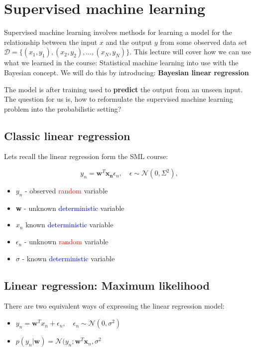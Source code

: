 
\section{Supervised machine learning}
Supervised machine learning involves methods for learning a model for the relationship between the input $x$ and the output $y$ from some observed data set $\mathcal{D} = \{(x_1,y_1), (x_2,y_2), \ldots, (x_N,y_N)\}$. This lecture will cover how we can use what we learned in the course: Statistical machine learning into use with the Bayesian concept. We will do this by introducing: \textbf{Bayesian linear regression}

The model is after training used to \textbf{predict} the output from an unseen input. The question for us is, how to reformulate the supervised machine learning problem into the probabilistic setting?


\subsection{Classic linear regression}
Lets recall the linear regression form the SML course:

\begin{equation}
	y_n = \bm{w}^{T} \bm{x_n} \epsilon_n, \quad \epsilon \sim \mathcal{N}(0,\Sigma^{2}),  
\end{equation}

\begin{itemize}
	\item $y_n$ - observed \textcolor{red}{random} variable
	\item \textbf{w} - unknown \textcolor{blue}{deterministic} variable 
	\item $x_n$ known \textcolor{blue}{deterministic} variable
	\item $\epsilon_n$ - unknown \textcolor{red}{random} variable
	\item $\sigma $ - known \textcolor{blue}{deterministic} variable 
\end{itemize}

\subsection{Linear regression: Maximum likelihood}
There are two equivalent ways of expressing the linear regression model:

\begin{itemize}
	\item $y_n = \bm{w}^{T}x_n + \epsilon_n, \quad \epsilon_n \sim \mathcal{N}(0, \sigma ^{2} )$ 
	\item $p(y_n|\bm{w}) = \mathcal{N}(y_n; \bm{w}^{T}\bm{x}_n, \sigma ^{2}$ 
\end{itemize}

